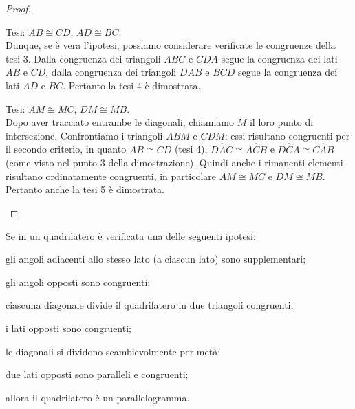 \begin{proof}
\begin{enumerate*}
    \item Tesi: \(AB\cong CD\), \(AD\cong BC\).\\
    Dunque, se è vera l'ipotesi, possiamo considerare verificate le 
    congruenze della tesi 3. Dalla congruenza dei triangoli \(ABC\) e \(CDA\) 
    segue la congruenza dei lati \(AB\) e \(CD\), dalla congruenza dei 
    triangoli \(DAB\) e \(BCD\) segue la congruenza dei lati \(AD\) e \(BC\). 
    Pertanto la tesi 4 è dimostrata.
    
    \item Tesi: \(AM\cong MC\), \(DM\cong MB\).\\
    Dopo aver tracciato entrambe le diagonali, chiamiamo \(M\) il loro 
    punto di intersezione. Confrontiamo i triangoli \(ABM\) e \(CDM\): essi 
    risultano congruenti per il secondo criterio, in quanto \(AB\cong CD\) 
    (tesi 4), \(D\widehat{A}C\cong A\widehat{C}B\) e \(D\widehat{C}A\cong 
    C\widehat{A}B\) (come visto nel punto 3 della dimostrazione). Quindi 
    anche i rimanenti elementi risultano ordinatamente congruenti, in 
    particolare \(AM\cong MC\) e \(DM\cong MB\). Pertanto anche la tesi 5 è 
    dimostrata.
  \end{enumerate*}
\end{proof}


\begin{teorema}
  Se in un quadrilatero è verificata una delle seguenti ipotesi:
  \begin{enumerate*}
    \item gli angoli adiacenti allo stesso lato (a ciascun lato) sono 
    supplementari;
    \item gli angoli opposti sono congruenti;
    \item ciascuna diagonale divide il quadrilatero in due triangoli 
    congruenti;
    \item i lati opposti sono congruenti;
    \item le diagonali si dividono scambievolmente per metà;
    \item due lati opposti sono paralleli e congruenti;
  \end{enumerate*}
  allora il quadrilatero è un parallelogramma.
\end{teorema}

